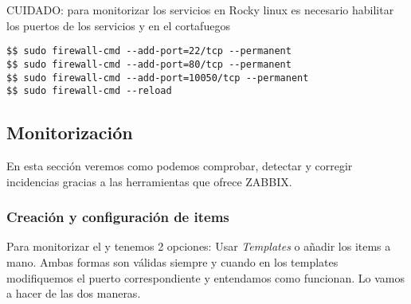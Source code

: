 CUIDADO: para monitorizar los servicios en Rocky linux es necesario habilitar los puertos de los servicios  y  en el cortafuegos
\begin{verbatim}
$$ sudo firewall-cmd --add-port=22/tcp --permanent
$$ sudo firewall-cmd --add-port=80/tcp --permanent
$$ sudo firewall-cmd --add-port=10050/tcp --permanent
$$ sudo firewall-cmd --reload
\end{verbatim}

\subsection{Monitorización}
En esta sección veremos como podemos comprobar, detectar y corregir incidencias gracias a las herramientas que ofrece ZABBIX.
\subsubsection{Creación y configuración de items}
Para monitorizar el  y  tenemos 2 opciones: Usar \textit{Templates} o añadir los items a mano. Ambas formas son válidas siempre y cuando en los templates modifiquemos el puerto correspondiente y entendamos como funcionan. Lo vamos a hacer de las dos maneras.
